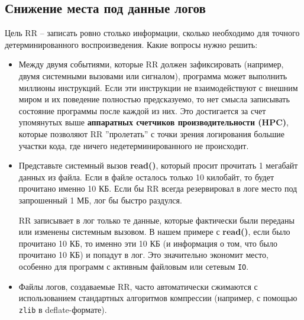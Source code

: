 \subsection{Снижение места под данные логов}



Цель RR – записать ровно столько информации, сколько необходимо для точного
детерминированного воспроизведения. Какие вопросы нужно решить:

\begin{itemize}

  \item Между двумя событиями, которые RR должен зафиксировать (например, двумя
  системными вызовами или сигналом), программа может выполнить миллионы
  инструкций. Если эти инструкции не взаимодействуют с внешним миром и их
  поведение полностью предсказуемо, то нет смысла записывать состояние
  программы после каждой из них. Это достигается за счет упомянутых выше
  \textbf{аппаратных счетчиков производительности (HPC)}, которые позволяют RR
  ''пролетать'' с точки зрения логирования большие участки кода, где ничего
  недетерминированного не происходит.

  \item Представьте системный вызов \textbf{read()}, который просит прочитать 1 мегабайт
  данных из файла. Если в файле осталось только 10 килобайт, то будет прочитано
  именно 10 КБ. Если бы RR всегда резервировал в логе место под запрошенный 1
  МБ, лог бы быстро раздулся. 

  RR записывает в лог только те данные, которые фактически были переданы или
  изменены системным вызовом. В нашем примере с \textbf{read()}, если было прочитано 10
  КБ, то именно эти 10 КБ (и информация о том, что было прочитано 10 КБ) и
  попадут в лог. Это значительно экономит место, особенно для программ с
  активным файловым или сетевым \texttt{IO}.

  \item Файлы логов, создаваемые RR, часто автоматически сжимаются с
  использованием стандартных алгоритмов компрессии (например, с помощью
  \texttt{zlib} в deflate-формате).

\end{itemize}

